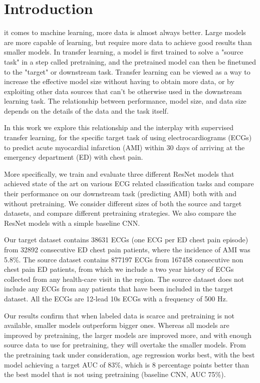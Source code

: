 \documentclass[journal,twoside,web]{ieeecolor}
\begin{document}
\section{Introduction}
\label{sec:introduction}
 it comes to machine learning, more data is almost always better. Large models are more capable of learning, but require more data to achieve good results than smaller models. In transfer learning, a model is first trained to solve a "source task" in a step called pretraining, and the pretrained model can then be finetuned to the "target" or downstream task. Transfer learning can be viewed as a way to increase the effective model size without having to obtain more data, or by exploiting other data sources that can't be otherwise used in the downstream learning task. The relationship between performance, model size, and data size depends on the details of the data and the task itself.

In this work we explore this relationship and the interplay with supervised transfer learning, for the specific target task of using electrocardiograms (ECGs) to predict acute myocardial infarction (AMI) within 30 days of arriving at the emergency department (ED) with chest pain. 

More specifically, we train and evaluate three different ResNet models that achieved state of the art on various ECG related classification tasks and compare their performance on our downstream task (predicting AMI) both with and without pretraining. We consider different sizes of both the source and target datasets, and compare different pretraining strategies. We also compare the ResNet models with a simple baseline CNN.

Our target dataset contains 38631 ECGs (one ECG per ED chest pain episode) from 32892 consecutive ED chest pain patients, where the incidence of AMI was 5.8\%. The source dataset contains 877197 ECGs from 167458 consecutive non chest pain ED patients, from which we include a two year history of ECGs collected from any health-care visit in the region. The source dataset does not include any ECGs from any patients that have been included in the target dataset. All the ECGs are 12-lead 10s ECGs with a frequency of 500 Hz. 

Our results confirm that when labeled data is scarce and pretraining is not available, smaller models outperform bigger ones. Whereas all models are improved by pretraining, the larger models are improved more, and with enough source data to use for pretraining, they will overtake the smaller models. From the pretraining task under consideration, age regression works best, with the best model achieving a target AUC of 83\%, which is 8 percentage points better than the best model that is not using pretraining (baseline CNN, AUC 75\%).
\end{document}
